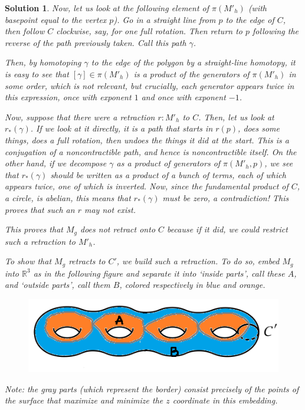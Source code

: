 \documentclass{article}
\theoremstyle{plain}
\theoremstyle{nonumberplain}
\newtheorem{sol}{Solution}
\newcommand{\R}{\mathbb{R}}
\begin{document}
\begin{sol}
Now, let us look at the following element of $\pi(M'_h)$ (with basepoint equal to the vertex $p$). Go in a straight line from $p$ to the edge of $C$, then follow $C$ clockwise, say, for one full rotation. Then return to $p$ following the reverse of the path previously taken. Call this path $\gamma$.

Then, by homotoping $\gamma$ to the edge of the polygon by a straight-line homotopy, it is easy to see that $[\gamma] \in \pi(M'_h)$ is a product of the generators of $\pi(M'_h)$ in some order, which is not relevant, but crucially, \emph{each generator appears twice in this expression, once with exponent $1$ and once with exponent $-1$}.

Now, suppose that there were a retraction $r \colon M'_h$ to $C$. Then, let us look at $r_*(\gamma)$. If we look at it directly, it is a path that starts in $r(p)$, does some things, does a full rotation, then undoes the things it did at the start. This is a conjugation of a noncontractible path, and hence is noncontractible itself. On the other hand, if we decompose $\gamma$ as a product of generators of $\pi(M'_h, p)$, we see that $r_*(\gamma)$ should be written as a product of a bunch of terms, each of which appears twice, one of which is inverted. Now, since the fundamental product of $C$, a circle, is abelian, this means that $r_*(\gamma)$ must be zero, a contradiction! This proves that such an $r$ may not exist.

\smallskip

This proves that $M_g$ does not retract onto $C$ because if it did, we could restrict such a retraction to $M'_h$.

\medskip

To show that $M_g$ retracts to $C'$, we build such a retraction. To do so, embed $M_g$ into $\R^3$ as in the following figure and separate it into `inside parts', call these $A$, and `outside parts', call them $B$, colored respectively in blue and orange.
\begin{figure}[H]
\centering
\includegraphics{mph2}
\end{figure}

Note: the gray parts (which represent the border) consist precisely of the points of the surface that maximize and minimize the $z$ coordinate in this embedding.


\end{sol}
\end{document}
